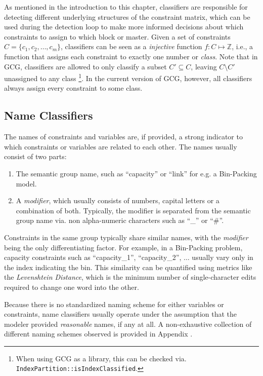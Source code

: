		As mentioned in the introduction to this chapter, classifiers are responsible for detecting different underlying structures of the constraint matrix, which can be used during the detection loop to make more informed decisions about which constraints to assign to which block or master.
		Given a set of constraints $C = \{ c_1, c_2, \ldots, c_m \}$, classifiers can be seen as a \textit{injective} function $f: C \mapsto \mathbb{Z}$, i.e., a function that assigns each constraint to exactly one number or \textit{class}.
		Note that in \acs{GCG}, classifiers are allowed to only classify a subset $C' \subseteq C$, leaving $C \setminus C'$ unassigned to any class \footnote{When using \ac{GCG} as a library, this can be checked via. \lstinline|IndexPartition::isIndexClassified|.}.
		In the current version of \ac{GCG}, however, all classifiers always assign every constraint to some class.
		
		\subsection{Name Classifiers}
		
			The names of constraints and variables are, if provided, a strong indicator to which constraints or variables are related to each other.
			The names usually consist of two parts:
			\begin{enumerate}
				\item The semantic group name, such as \enquote{capacity} or \enquote{link} for e.g. a Bin-Packing model. 
				\item A \textit{modifier}, which usually consists of numbers, capital letters or a combination of both. Typically, the modifier is separated from the semantic group name via.  non alpha-numeric characters such as \enquote{\_} or \enquote{\#}.
			\end{enumerate}
		
			Constraints in the same group typically share similar names, with the \textit{modifier} being the only differentiating factor. For example, in a Bin-Packing problem, capacity constraints such as \enquote{capacity\_1}, \enquote{capacity\_2}, $\ldots$ usually vary only in the index indicating the bin. This similarity can be quantified using metrics like the \textit{Levenshtein Distance}, which is the minimum number of single-character edits required to change one word into the other.
			
			Because there is no standardized naming scheme for either variables or constraints, name classifiers usually operate under the assumption that the modeler provided \textit{reasonable} names, if any at all.
			A non-exhaustive collection of different naming schemes observed is provided in Appendix .
			
